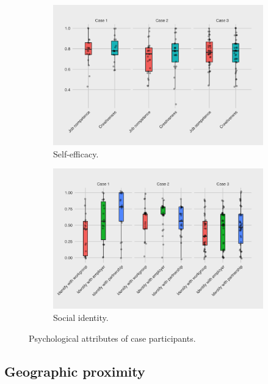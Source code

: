 \begin{landscape}
\begin{figure}
\begin{subfigure}[b]{0.7\textwidth}
\includegraphics[width=\textwidth]{Images/efficacy_case.png}
\caption[]%
{{\small Self-efficacy.}}    
\label{fig:efficacy}
\end{subfigure}
\hfill
\begin{subfigure}[b]{0.7\textwidth}   
\centering 
\includegraphics[width=\textwidth]{Images/identification_case.png}
\caption[]%
{{\small Social identity.}}    
\label{fig:identification}
\end{subfigure}
\caption[Psychological attributes of case participants]
{\small {Psychological attributes of case participants.}} 
\label{fig:psycho}
\end{figure}
\end{landscape}

\subsection{Geographic proximity}

